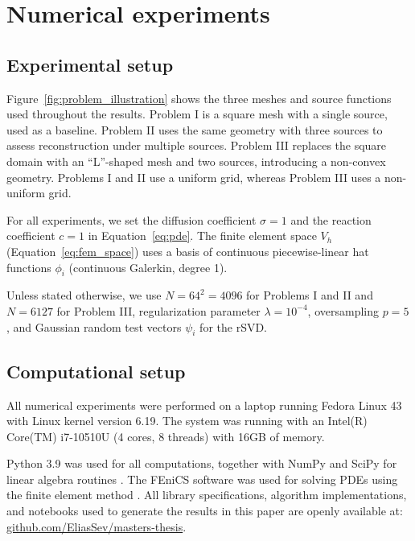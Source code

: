 \section{Numerical experiments}
\label{sec:experiments}


\subsection{Experimental setup}\label{sec:problems}

Figure~\ref{fig:problem_illustration} shows the three meshes and source functions used throughout the results. Problem I is a square mesh with a single source, used as a baseline. Problem II uses the same geometry with three sources to assess reconstruction under multiple sources. Problem III replaces the square domain with an ``L''-shaped mesh and two sources, introducing a non-convex geometry. Problems I 
and II use a uniform grid, whereas Problem III uses a non-uniform grid.

For all experiments, we set the diffusion coefficient $\sigma = 1$ and the reaction coefficient $c = 1$ in Equation~\eqref{eq:pde}. The finite element space $V_h$ (Equation~\eqref{eq:fem_space}) uses a basis of continuous piecewise-linear hat functions $\phi_i$ (continuous Galerkin, degree 1).

Unless stated otherwise, we use $N = 64^2 = 4096$ for Problems I and II and $N = 6127$ for Problem III, regularization parameter $\lambda = 10^{-4}$, oversampling $p = 5$, and Gaussian random test vectors $\psi_i$ for the rSVD.


\subsection{Computational setup}
All numerical experiments were performed on a laptop running Fedora Linux 43 with Linux kernel version 6.19. The system was running with an Intel(R) Core(TM) i7-10510U (4 cores, 8 threads) with 16GB of memory.

Python 3.9 was used for all computations, together with NumPy and SciPy for linear algebra routines \cite{harrisArrayProgrammingNumPy2020,virtanenSciPy10Fundamental2020}. The FEniCS software was used for solving PDEs using the finite element method \cite{alnaesFEniCSProjectVersion2015,loggAutomatedSolutionDifferential2012}. All library specifications, algorithm implementations, and notebooks used to generate the results in this paper are openly available at: \href{https://github.com/EliasSev/masters-thesis}{github.com/EliasSev/masters-thesis}.


